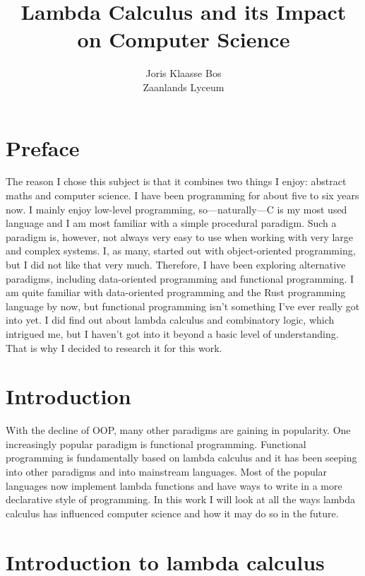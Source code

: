 \documentclass[11pt]{book}
\title{Lambda Calculus and its Impact on Computer Science}
\author{Joris Klaasse Bos\\ Zaanlands Lyceum}
\begin{document}
\maketitle

\chapter*{Preface}


The reason I chose this subject is that it combines two things I enjoy:
abstract maths and computer science. I have been programming for about five to
six years now. I mainly enjoy low-level programming, so---naturally---C is my
most used language and I am most familiar with a simple procedural paradigm.
Such a paradigm is, however, not always very easy to use when working with very
large and complex systems. I, as many, started out with object-oriented
programming, but I did not like that very much. Therefore, I have been
exploring alternative paradigms, including data-oriented programming and
functional programming. I am quite familiar with data-oriented programming and
the Rust programming language by now, but functional programming isn't
something I've ever really got into yet. I did find out about lambda calculus
and combinatory logic, which intrigued me, but I haven’t got into it beyond a
basic level of understanding. That is why I decided to research it for this
work. 

\tableofcontents

\chapter*{Introduction}

With the decline of OOP, many other paradigms are gaining in popularity. One
increasingly popular paradigm is functional programming. Functional programming
is fundamentally based on lambda calculus and it has been seeping into other
paradigms and into mainstream languages. Most of the popular languages now
implement lambda functions and have ways to write in a more declarative style
of programming. In this work I will look at all the ways lambda calculus has
influenced computer science and how it may do so in the future.

\chapter{Introduction to lambda calculus}
\end{document}
